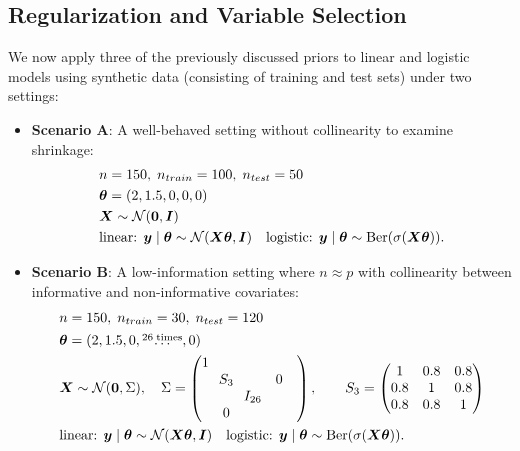 \subsection{Regularization and Variable Selection}

We now apply three of the previously discussed priors to linear and logistic models using synthetic data (consisting of training and test sets) under two settings:

\begin{itemize}
    \item \textbf{Scenario A}: A well-behaved setting without collinearity to examine shrinkage:
    \begin{equation*}
        \begin{aligned}
            &n = 150,\; n_{train} = 100,\;n_{test} = 50 \\
            &\bm{\theta} = (2, 1.5, 0, 0, 0) \\
            &\bm{X} \sim \mathcal{N}(\bm{0}, \bm{I}) \\
            &\text{linear: } \bm{y} \mid \bm{\theta} \sim \mathcal{N}(\bm{X} \bm{\theta},\bm{I})\quad \text{logistic: } \bm{y} \mid \bm{\theta} \sim \text{Ber}(\sigma(\bm{X} \bm{\theta})).
        \end{aligned}
    \end{equation*}
    \item \textbf{Scenario B}: A low-information setting where $n \approx p$ with collinearity between informative and non-informative covariates:
    \begin{equation*}
        \begin{aligned}
            &n = 150,\; n_{train} = 30,\;n_{test} = 120 \\
            &\bm{\theta} = (2, 1.5, 0, \overset{26\; \text{times}}{\dots}, 0) \\
            &\bm{X} \sim \mathcal{N}(\bm{0}, \Sigma), \quad \Sigma =
                    \begin{pmatrix}
                    1 &        &         &        &        \\
                        & \!\!S_3\!\! &        & 0      &        \\
                        &        & I_{26} &        &        \\
                        & 0      &        &        &        \\
                    \end{pmatrix},
                    \qquad
                    S_3 = 
                    \begin{pmatrix}
                    1   & 0.8 & 0.8\\
                    0.8 & 1   & 0.8\\
                    0.8 & 0.8 & 1
                    \end{pmatrix}\\
            &\text{linear: } \bm{y} \mid \bm{\theta} \sim \mathcal{N}(\bm{X} \bm{\theta}, \bm{I})\quad \text{logistic: } \bm{y} \mid \bm{\theta} \sim \text{Ber}(\sigma(\bm{X} \bm{\theta})).
        \end{aligned}
    \end{equation*}
\end{itemize}

